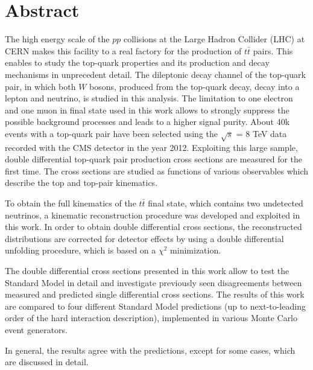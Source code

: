 \thispagestyle{empty}
\vspace{-3cm}
\section*{\centering Abstract}

\vspace{\baselineskip}

The high energy scale of the $pp$ collisions at the Large Hadron Collider (LHC) at CERN makes this facility
to a real factory for the production of $t\bar{t}$ pairs. This enables to study the top-quark 
properties and its production and decay mechanisms in unprecedent detail. The dileptonic decay channel of the
top-quark pair, in which both $W$ bosons, produced from the top-quark decay, decay into a lepton and neutrino,
is studied in this analysis. The limitation to one electron and one muon in final state 
used in this work allows to strongly suppress the possible background processes and leads to a higher
signal purity.
About 40k events with a 
top-quark pair have been selected using the $\sqrt{s}$ = 8 TeV data recorded with the CMS detector 
in the year 2012. Exploiting this large sample, double differential top-quark pair production 
cross sections are measured for the first time. The cross sections are studied as functions of
various observables which describe the top and top-pair kinematics. 

To obtain the full kinematics of the $t\bar{t}$ final state, which contains two undetected neutrinos,
a kinematic reconstruction procedure was developed and exploited in this work. In order to obtain
double differential cross sections, the reconstructed distributions
are corrected for detector effects by using a double differential unfolding procedure, which is
based on a $\chi^{2}$ minimization.

The double differential cross sections presented in this work allow to test the Standard Model 
in detail and investigate previously seen disagreements between measured and predicted single differential cross sections.
The results of this work are compared to four different Standard Model predictions (up to next-to-leading order
of the hard interaction description), implemented in various Monte Carlo event generators.

In general, the results agree with the predictions, except for some cases, which are discussed
in detail.

\clearpage
